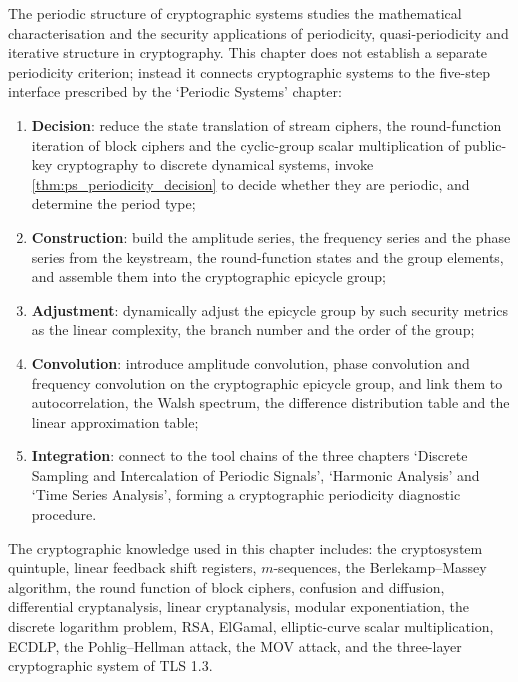 \begin{remark}\label{rem:crypto_chapter_positioning}
The periodic structure of cryptographic systems studies the mathematical characterisation and the security applications of periodicity, quasi-periodicity and iterative structure in cryptography. This chapter does not establish a separate periodicity criterion; instead it connects cryptographic systems to the five-step interface prescribed by the `Periodic Systems' chapter:
\begin{enumerate}[label=(\arabic*)]
    \item \textbf{Decision}: reduce the state translation of stream ciphers, the round-function iteration of block ciphers and the cyclic-group scalar multiplication of public-key cryptography to discrete dynamical systems, invoke \cref{thm:ps_periodicity_decision} to decide whether they are periodic, and determine the period type;
    \item \textbf{Construction}: build the amplitude series, the frequency series and the phase series from the keystream, the round-function states and the group elements, and assemble them into the cryptographic epicycle group;
    \item \textbf{Adjustment}: dynamically adjust the epicycle group by such security metrics as the linear complexity, the branch number and the order of the group;
    \item \textbf{Convolution}: introduce amplitude convolution, phase convolution and frequency convolution on the cryptographic epicycle group, and link them to autocorrelation, the Walsh spectrum, the difference distribution table and the linear approximation table;
    \item \textbf{Integration}: connect to the tool chains of the three chapters `Discrete Sampling and Intercalation of Periodic Signals', `Harmonic Analysis' and `Time Series Analysis', forming a cryptographic periodicity diagnostic procedure.
\end{enumerate}
The cryptographic knowledge used in this chapter includes: the cryptosystem quintuple, linear feedback shift registers, \(m\)-sequences, the Berlekamp--Massey algorithm, the round function of block ciphers, confusion and diffusion, differential cryptanalysis, linear cryptanalysis, modular exponentiation, the discrete logarithm problem, RSA, ElGamal, elliptic-curve scalar multiplication, ECDLP, the Pohlig--Hellman attack, the MOV attack, and the three-layer cryptographic system of TLS 1.3.
\end{remark}

